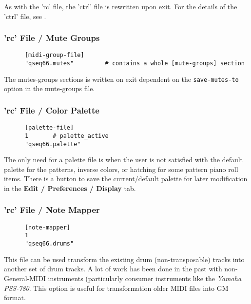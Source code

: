    As with the 'rc' file, the 'ctrl' file is rewritten upon exit.
   For the details of the 'ctrl' file, see
   .

\subsubsection{'rc' File / Mute Groups}
\label{subsubsec:configuration_rc_mute_groups}

   \begin{verbatim}
      [midi-group-file]
      "qseq66.mutes"         # contains a whole [mute-groups] section
   \end{verbatim}

   The mutes-groups sections is written on exit dependent on the
   \texttt{save-mutes-to} option in the mute-groups file.

\subsubsection{'rc' File / Color Palette}
\label{subsubsec:configuration_rc_color_palette}

   \begin{verbatim}
      [palette-file]
      1       # palette_active
      "qseq66.palette"
   \end{verbatim}

   The only need for a palette file is when the user is not satisfied with the
   default palette for the patterns, inverse colors, or hatching for some pattern
   piano roll items.  There is a button to save the current/default palette for
   later modification in the \textbf{Edit / Preferences / Display} tab.

\subsubsection{'rc' File / Note Mapper}
\label{subsubsec:configuration_rc_note_mapper}

   \begin{verbatim}
      [note-mapper]
      1
      "qseq66.drums"
   \end{verbatim}

   This file can be used transform the existing drum (non-transposable) tracks
   into another set of drum tracks.  A lot of work has been done in the past
   with non-General-MIDI instruments (particularly consumer instruments like the
   \textsl{Yamaha PSS-780}.
   This option is useful for transformation older MIDI files into GM format.

